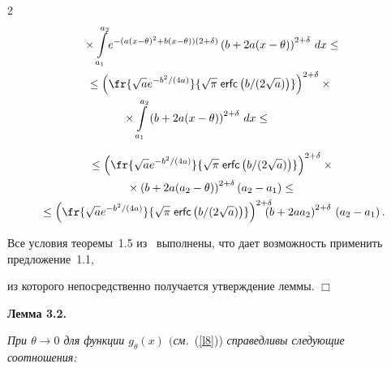 \begin{multicols}{2}
\begin{multline*}
\!{}\times


\int\limits_{a_1}^{a_2}\! e^{-(a(x-\theta)^2+b(x-\theta))(2+\delta)} 


\left(b+2a(x-\theta)\right)^{2+\delta}\, dx \leq\hspace*{-0.78734pt}\\


\leq \left(\fr{\sqrt{a} e^{-{b^2}/(4a)}}{\sqrt{\pi}\;{\sf erfc}\left(b/(2\sqrt{a})\right)}\right)^{2+\delta} \times{}\\


{}\times


\int\limits_{a_1}^{a_2} \left(b + 2a(x - \theta)\right)^{2 + \delta}\, dx \leq\hspace*{10mm}


 \end{multline*}


 \begin{multline*}


{}


\leq \left(\fr{\sqrt{a} e^{-{b^2}/(4a)}}{\sqrt{\pi}\;{\sf erfc}\left(b/(2\sqrt{a})\right)}\right)^{2+\delta}\times{}\\


{}\times\left(b + 2a(a_2 - \theta)\right)^{2 + 


\delta}\left(a_2 - a_1\right) \leq{}\\


{}


\leq \left(\fr{\sqrt{a} e^{-{b^2}/(4a)}}{\sqrt{\pi}\;{\sf erfc}\left(b/(2\sqrt{a})\right)}\right)^{2+\delta}\,


\!\!\!\!\!\!\left(b + 2aa_2\right)^{2 + \delta}\,(a_2 - a_1)\,.\hspace*{-1.38pt}


\end{multline*}


Все условия теоремы~1.5 из~\cite{chibisov} выполнены, что дает возможность применить предложение~1.1, 


из которого непосредственно получается утверждение леммы. \hfill $\Box$








\smallskip





\noindent


\textbf{Лемма 3.2.}


\textit{При $\theta \to 0$ для функции $g_{\theta}(x)$ $($см.}\ (\ref{l8})) \textit{справедливы следующие соотношения:}



\end{multicols}
